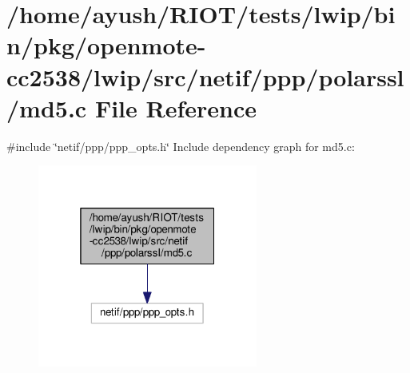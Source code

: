 \hypertarget{openmote-cc2538_2lwip_2src_2netif_2ppp_2polarssl_2md5_8c}{}\section{/home/ayush/\+R\+I\+O\+T/tests/lwip/bin/pkg/openmote-\/cc2538/lwip/src/netif/ppp/polarssl/md5.c File Reference}
\label{openmote-cc2538_2lwip_2src_2netif_2ppp_2polarssl_2md5_8c}
{\ttfamily \#include \char`\"{}netif/ppp/ppp\+\_\+opts.\+h\char`\"{}}\newline
Include dependency graph for md5.\+c\+:
\nopagebreak
\begin{figure}[H]
\begin{center}
\leavevmode
\includegraphics[width=205pt]{openmote-cc2538_2lwip_2src_2netif_2ppp_2polarssl_2md5_8c__incl}
\end{center}
\end{figure}
